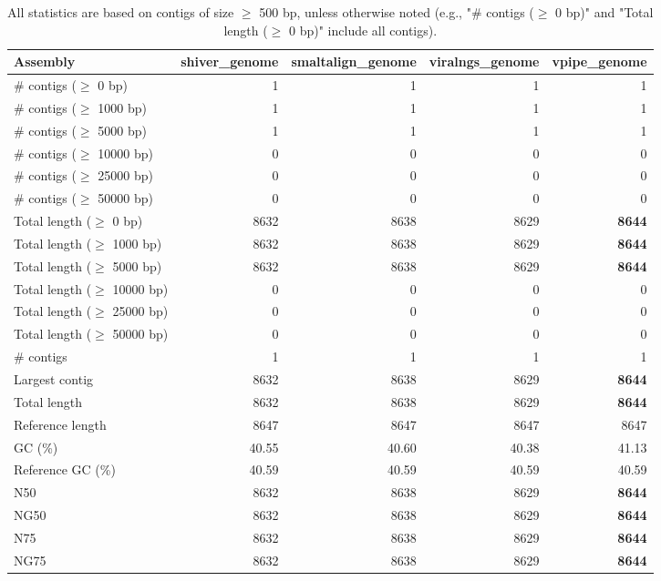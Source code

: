 \documentclass[12pt,a4paper]{article}
\begin{document}
\begin{table}[ht]
\begin{center}
\caption{All statistics are based on contigs of size $\geq$ 500 bp, unless otherwise noted (e.g., "\# contigs ($\geq$ 0 bp)" and "Total length ($\geq$ 0 bp)" include all contigs).}
\begin{tabular}{|l*{4}{|r}|}
\hline
Assembly & shiver\_genome & smaltalign\_genome & viralngs\_genome & vpipe\_genome \\ \hline
\# contigs ($\geq$ 0 bp) & 1 & 1 & 1 & 1 \\ \hline
\# contigs ($\geq$ 1000 bp) & 1 & 1 & 1 & 1 \\ \hline
\# contigs ($\geq$ 5000 bp) & 1 & 1 & 1 & 1 \\ \hline
\# contigs ($\geq$ 10000 bp) & 0 & 0 & 0 & 0 \\ \hline
\# contigs ($\geq$ 25000 bp) & 0 & 0 & 0 & 0 \\ \hline
\# contigs ($\geq$ 50000 bp) & 0 & 0 & 0 & 0 \\ \hline
Total length ($\geq$ 0 bp) & 8632 & 8638 & 8629 & {\bf 8644} \\ \hline
Total length ($\geq$ 1000 bp) & 8632 & 8638 & 8629 & {\bf 8644} \\ \hline
Total length ($\geq$ 5000 bp) & 8632 & 8638 & 8629 & {\bf 8644} \\ \hline
Total length ($\geq$ 10000 bp) & 0 & 0 & 0 & 0 \\ \hline
Total length ($\geq$ 25000 bp) & 0 & 0 & 0 & 0 \\ \hline
Total length ($\geq$ 50000 bp) & 0 & 0 & 0 & 0 \\ \hline
\# contigs & 1 & 1 & 1 & 1 \\ \hline
Largest contig & 8632 & 8638 & 8629 & {\bf 8644} \\ \hline
Total length & 8632 & 8638 & 8629 & {\bf 8644} \\ \hline
Reference length & 8647 & 8647 & 8647 & 8647 \\ \hline
GC (\%) & 40.55 & 40.60 & 40.38 & 41.13 \\ \hline
Reference GC (\%) & 40.59 & 40.59 & 40.59 & 40.59 \\ \hline
N50 & 8632 & 8638 & 8629 & {\bf 8644} \\ \hline
NG50 & 8632 & 8638 & 8629 & {\bf 8644} \\ \hline
N75 & 8632 & 8638 & 8629 & {\bf 8644} \\ \hline
NG75 & 8632 & 8638 & 8629 & {\bf 8644} \\ \hline

\end{tabular}
\end{center}
\end{table}
\end{document}
